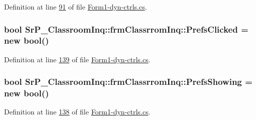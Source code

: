 \-Definition at line \hyperlink{_form1-dyn-ctrls_8cs_source_l00091}{91} of file \hyperlink{_form1-dyn-ctrls_8cs_source}{\-Form1-\/dyn-\/ctrls.\-cs}.

\hypertarget{class_sr_p___classroom_inq_1_1frm_classrrom_inq_a9e5a6ce376468f2e13dae9f60e86ccf6}{
\subsubsection[{\-Prefs\-Clicked}]{\setlength{\rightskip}{0pt plus 5cm}bool {\bf \-Sr\-P\-\_\-\-Classroom\-Inq\-::frm\-Classrrom\-Inq\-::\-Prefs\-Clicked} = new bool()}}
\label{class_sr_p___classroom_inq_1_1frm_classrrom_inq_a9e5a6ce376468f2e13dae9f60e86ccf6}


\-Definition at line \hyperlink{_form1-dyn-ctrls_8cs_source_l00139}{139} of file \hyperlink{_form1-dyn-ctrls_8cs_source}{\-Form1-\/dyn-\/ctrls.\-cs}.

\hypertarget{class_sr_p___classroom_inq_1_1frm_classrrom_inq_a915bf1ba42b54c697d1d90043610385f}{
\subsubsection[{\-Prefs\-Showing}]{\setlength{\rightskip}{0pt plus 5cm}bool {\bf \-Sr\-P\-\_\-\-Classroom\-Inq\-::frm\-Classrrom\-Inq\-::\-Prefs\-Showing} = new bool()}}
\label{class_sr_p___classroom_inq_1_1frm_classrrom_inq_a915bf1ba42b54c697d1d90043610385f}


\-Definition at line \hyperlink{_form1-dyn-ctrls_8cs_source_l00138}{138} of file \hyperlink{_form1-dyn-ctrls_8cs_source}{\-Form1-\/dyn-\/ctrls.\-cs}.

